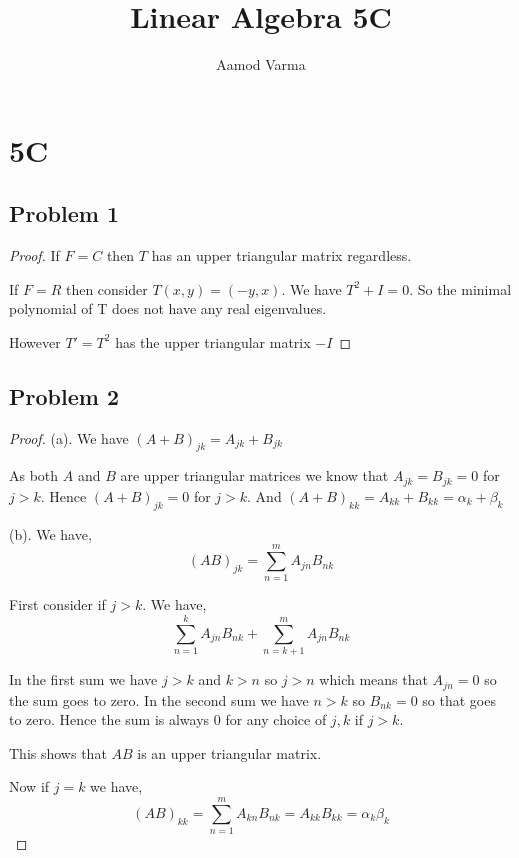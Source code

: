 \documentclass[a4paper]{report}
\title{Linear Algebra 5C}
\author{Aamod Varma}
\begin{document}
\maketitle
\date{}

\section*{5C}
\subsection*{Problem 1}
\begin{proof}
   If $F =  C$ then $T$ has an upper triangular matrix regardless.

   If $F = R$ then consider $T(x,y) = (-y,x)$. We have $T^2 + I = 0$. So  the minimal polynomial of T does not have any real eigenvalues. 

   However $T' = T^2 $ has the upper triangular matrix $-I$
\end{proof}


\subsection*{Problem 2}
\begin{proof}
   (a). We have $(A + B)_{jk} = A_{jk} + B_{jk}$

   As both $A$ and $B$ are upper triangular matrices we know that $A_{jk} = B_{jk} = 0$ for $j > k$. Hence $(A + B)_{jk} = 0$ for $j > k$. And $(A + B)_{kk} = A_{kk} + B_{kk} = \alpha_k + \beta_k$

   (b). We have, 
   $$ (AB)_{jk} = \sum_{n=1}^{m} A_{jn}B_{nk} $$ 

   First consider if $j > k$. We have, 
   $$ \sum_{n=1}^{k} A_{jn}B_{nk} + \sum_{n=k+1}^{m} A_{jn}B_{nk} $$ 

   In the first sum we have $j > k$ and $k > n$ so $j > n$ which means that $A_{jn} = 0$ so the sum goes to zero. In the second sum we have $n > k$ so $B_{nk} = 0$ so that goes to zero. Hence the sum is always 0 for any choice of $j,k$ if $j > k$.

   This shows that $AB$ is an upper triangular matrix.

   Now if $j = k$ we have, 
   $$ (AB)_{kk} = \sum_{n=1}^{m} A_{kn} B_{nk} = A_{kk} B_{kk}  = \alpha_k \beta_k$$ 


\end{proof}
\end{document}
